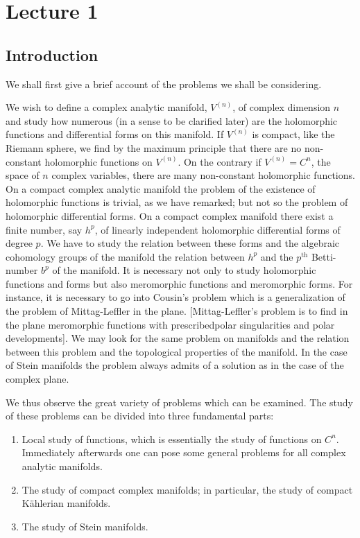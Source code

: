 \chapter{Lecture 1}

\section*{Introduction}\pageoriginale

We shall first give a brief account of the problems we shall be considering.

We wish to define a complex analytic manifold, $V^{(n)}$, of complex
dimension $n$ and study how numerous (in a sense to be clarified
later) are the holomorphic functions and differential forms on this
manifold. If $V^{(n)}$ is compact, like the Riemann sphere, we find by
the maximum principle that there are no non-constant holomorphic
functions on $V^{(n)}$. On the contrary if $V^{(n)}=C^{n}$, the space
of $n$ complex variables, there are many non-constant holomorphic
functions. On a compact complex analytic manifold the problem of the
existence of holomorphic functions is trivial, as we have remarked;
but not so the problem of holomorphic differential forms. On a compact
complex manifold there exist a finite number, say $h^{p}$, of linearly
independent holomorphic differential forms of degree $p$. We have to
study the relation between these forms and the algebraic cohomology
groups of the manifold \iec the relation between $h^{p}$ and the
$p^{\text{th}}$ Betti-number $b^{p}$ of the manifold.
It is necessary not only to study holomorphic functions and forms but
also meromorphic functions and meromorphic forms. For instance, it is
necessary to go into Cousin's problem which is a generalization of the
problem of Mittag-Leffler in the plane. [Mittag-Leffler's problem is
  to find in the plane meromorphic functions with
  prescribed\pageoriginale polar singularities and polar
  developments]. We may look for the same problem on manifolds and the
relation between this problem and the topological properties of the
manifold. In the case of Stein manifolds the problem always admits of
a solution as in the case of the complex plane.

We thus observe the great variety of problems which can be
examined. The study of these problems can be divided into three
fundamental parts:
\begin{enumerate}
\renewcommand{\labelenumi}{\theenumi)}
\item Local study of functions, which is essentially the study of
  functions on $C^{n}$. Immediately afterwards one can pose some
  general problems for all complex analytic manifolds.

\item The study of compact complex manifolds; in particular, the study
  of compact K\"ahlerian manifolds.

\item The study of Stein manifolds.
\end{enumerate}

